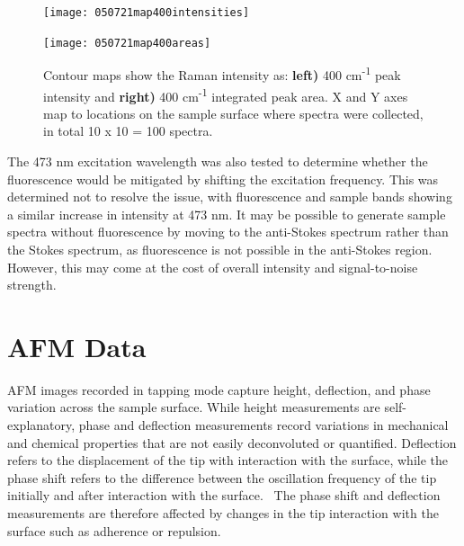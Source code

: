 \begin{figure}[H]
\centering
\begin{minipage}{.45\textwidth}
  \centering
  \texttt{[image: 050721map400intensities]}
\end{minipage}
\begin{minipage}{.45\textwidth}
  \centering
  \texttt{[image: 050721map400areas]}
\end{minipage}
\caption[Contour maps, azurite Raman intensity in historical cross section]{Contour maps show the Raman intensity as: \textbf{left)} 400 cm\textsuperscript{-1} peak intensity and \textbf{right)} 400 cm\textsuperscript{-1} integrated peak area. X and Y axes map to locations on the sample surface where spectra were collected, in total 10 x 10 = 100 spectra.}
\label{fig:contours_xsection}
\end{figure}

The 473 nm excitation wavelength was also tested to determine whether the fluorescence would be mitigated by shifting the excitation frequency. This was determined not to resolve the issue, with fluorescence and sample bands showing a similar increase in intensity at 473 nm. It may be possible to generate sample spectra without fluorescence by moving to the anti-Stokes spectrum rather than the Stokes spectrum, as fluorescence is not possible in the anti-Stokes region. However, this may come at the cost of overall intensity and signal-to-noise strength.





\section[AFM Data]{AFM Data}
\label{section3.4}


AFM images recorded in tapping mode capture height, deflection, and phase variation across the sample surface. While height measurements are self-explanatory, phase and deflection measurements record variations in mechanical and chemical properties that are not easily deconvoluted or quantified. Deflection refers to the displacement of the tip with interaction with the surface, while the phase shift refers to the difference between the oscillation frequency of the tip initially and after interaction with the surface.~\autocite{iscpi} The phase shift and deflection measurements are therefore affected by changes in the tip interaction with the surface such as adherence or repulsion. 

